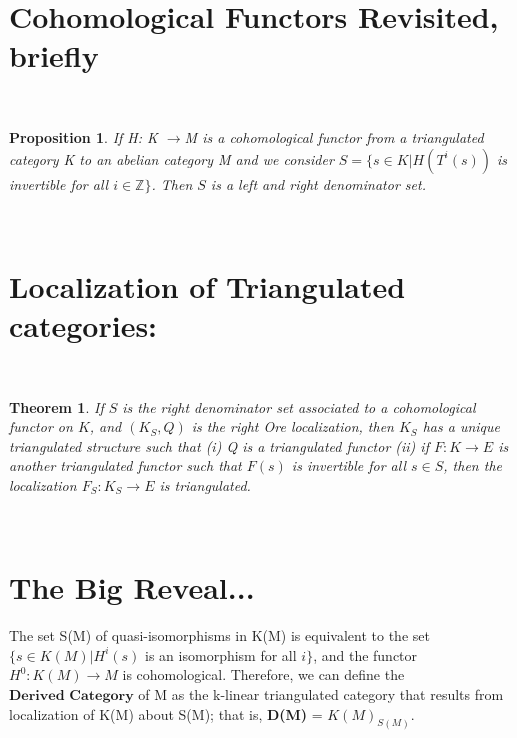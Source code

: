 \documentclass[12pt]{amsart}    %
\newtheorem{theorem}{Theorem}[section]
\newtheorem{proposition}{Proposition}
\theoremstyle{definition}
\begin{document}
\section{Cohomological Functors Revisited, briefly}


\

\begin{proposition}
If H: K $\rightarrow $M is a cohomological functor from a triangulated category K to an abelian category M and we consider $S = \{ s \in K | H(T^i(s)) $ is invertible for all $i \in \mathbb{Z}\}$.  Then $S$ is a left and right denominator set.  
\end{proposition}
\

\section{Localization of Triangulated categories:}


\

\begin{theorem}
If $S$ is the right denominator set associated to a cohomological functor on $K$, and $(K_S, Q)$ is the right Ore localization, then $K_S$ has a unique triangulated structure such that (i) Q is a triangulated functor (ii) if $F : K \rightarrow E$ is another triangulated functor such that $F(s)$ is invertible for all $s \in S$, then the localization $F_S: K_S \rightarrow E$ is triangulated.
\end{theorem}

\

\section{The Big Reveal...}


The set S(M) of quasi-isomorphisms in K(M) is equivalent to the set $\{s \in K(M) | H^i(s)$ is an isomorphism for all $i \}$, and the functor $H^0: K(M) \rightarrow M$ is cohomological.  Therefore, we can define the $\textbf{Derived Category}$ of M as the k-linear triangulated category that results from localization of K(M) about S(M); that is, \textbf{D(M)} = \textbf{$K(M)_{S(M)}$}.  
\end{document}
